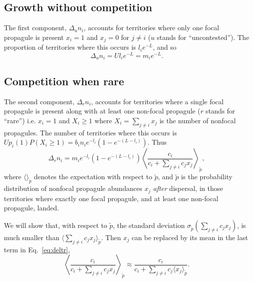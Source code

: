 \documentclass[11pt]{article}
\begin{document}
\subsection*{Growth without competition}

The first component, $\Delta_u n_i$, accounts for territories where only one focal propagule is present $x_i=1$ and $x_j=0$ for $j\neq i$ ($u$ stands for ``uncontested''). The proportion of territories where this occurs is $l_i e^{-L}$, and so 
\begin{equation}
\Delta_u n_i=Ul_i e^{-L}=m_i e^{-L}.
\end{equation}

\subsection*{Competition when rare}

The second component, $\Delta_r n_i$, accounts for territories where a single focal propagule is present along with at least one non-focal propagule ($r$ stands for ``rare'') i.e. $x_i=1$ and $X_i\geq 1$ where $X_i=\sum_{j\neq i} x_j$ is the number of nonfocal propagules. The number of territories where this occurs is $Up_i(1)P(X_i\geq 1)=b_i n_i e^{-l_i}(1-e^{-(L-l_i)})$. Thus 
\begin{equation}
\Delta_r n_i = m_i e^{-l_i}(1-e^{-(L-l_i)})\left\langle  \frac{c_i}{c_i +\sum_{j\neq i} c_j x_j } \right\rangle_{\tilde{p}},  \label{eq:deltr}
\end{equation}
where $\langle \rangle_{\tilde{p}}$ denotes the expectation with respect to $\tilde{p}$, and $\tilde{p}$ is the probability distribution of nonfocal propagule abundances $x_j$ \textit{after} dispersal, in those territories where exactly one focal propagule, and at least one non-focal propagule, landed. 

We will show that, with respect to $\tilde{p}$, the standard deviation $\sigma_{\tilde{p}}(\sum_{j\neq i} c_j x_j)$, is much smaller than $\langle\sum_{j\neq i} c_j x_j\rangle_{\tilde{p}}$. Then $x_j$ can be replaced by its mean in the last term in Eq.~\eqref{eq:deltr},
\begin{equation}
\left\langle\frac{c_i}{c_i +\sum_{j\neq i} c_j x_j}\right\rangle_{\tilde{p}}\approx \frac{c_i}{c_i +\sum_{j\neq i} c_j \langle x_j\rangle_{\tilde{p}}}.\label{eq:meanfieldr}
\end{equation}
\end{document}
